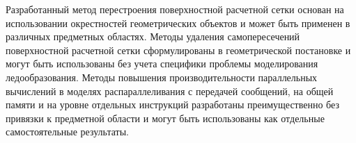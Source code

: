 Разработанный метод перестроения поверхностной расчетной сетки основан на использовании окрестностей геометрических объектов и может быть применен в различных предметных областях.
Методы удаления самопересечений поверхностной расчетной сетки сформулированы в геометрической постановке и могут быть использованы без учета специфики проблемы моделирования ледообразования.
Методы повышения производительности параллельных вычислений в моделях распараллеливания с передачей сообщений, на общей памяти и на уровне отдельных инструкций разработаны преимущественно без привязки к предметной области и могут быть использованы как отдельные самостоятельные результаты.